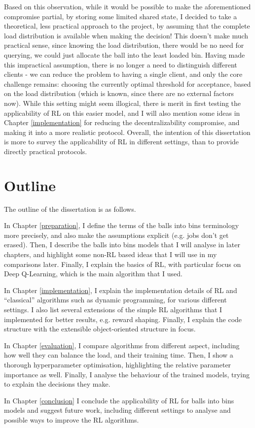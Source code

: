 Based on this observation, while it would be possible to make the aforementioned compromise partial, by storing some limited shared state, I decided to take a theoretical, less practical approach to the project, by assuming that the complete load distribution is available when making the decision! This doesn't make much practical sense, since knowing the load distribution, there would be no need for querying, we could just allocate the ball into the least loaded bin. Having made this impractical assumption, there is no longer a need to distinguish different clients - we can reduce the problem to having a single client, and only the core challenge remains: choosing the currently optimal threshold for acceptance, based on the load distribution (which is known, since there are no external factors now). While this setting might seem illogical, there is merit in first testing the applicability of RL on this easier model, and I will also mention some ideas in Chapter \ref{implementation} for reducing the decentralizability compromise, and making it into a more realistic protocol. Overall, the intention of this dissertation is more to survey the applicability of RL in different settings, than to provide directly practical protocols.



\section{Outline}

The outline of the dissertation is as follows.


In Chapter \ref{preparation}, I define the terms of the balls into bins terminology more precisely, and also make the assumptions explicit (e.g. jobs don't get erased). Then, I describe the balls into bins models that I will analyse in later chapters, and highlight some non-RL based ideas that I will use in my comparisons later. Finally, I explain the basics of RL, with particular focus on Deep Q-Learning, which is the main algorithm that I used.


In Chapter \ref{implementation}, I explain the implementation details of RL and ``classical'' algorithms such as dynamic programming, for various different settings. I also list several extensions of the simple RL algorithms that I implemented for better results, e.g. reward shaping. Finally, I explain the code structure with the extensible object-oriented structure in focus.


In Chapter \ref{evaluation}, I compare algorithms from different aspect, including how well they can balance the load, and their training time. Then, I show a thorough hyperparameter optimisation, highlighting the relative parameter importance as well. Finally, I analyse the behaviour of the trained models, trying to explain the decisions they make.


In Chapter \ref{conclusion} I conclude the applicability of RL for balls into bins models and suggest future work, including different settings to analyse and possible ways to improve the RL algorithms.